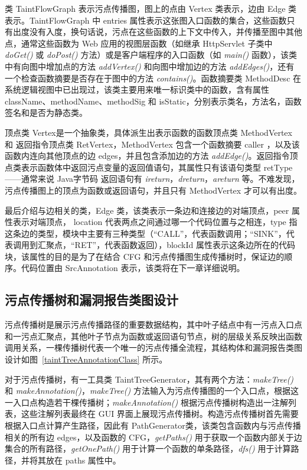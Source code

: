 类 TaintFlowGraph 表示污点传播图，图上的点由 Vertex 类表示，边由 Edge 类表示。TaintFlowGraph 中 entries 属性表示这张图入口函数的集合，这些函数只有出度没有入度，换句话说，污点在这些函数的上下文中传入，并传播至图中其他点，通常这些函数为 Web 应用的视图层函数（如继承 HttpServlet 子类中 \textit{doGet()} 或 \textit{doPost()} 方法）或是客户端程序的入口函数（如 \textit{main()} 函数），该类中有向图中增加点的方法 \textit{addVertex()} 和向图中增加边的方法 \textit{addEdges()}，还有一个检查函数摘要是否存在于图中的方法 \textit{contains()}。函数摘要类 MethodDesc 在系统逻辑视图中已出现过，该类主要用来唯一标识类中的函数，含有属性 className、methodName、methodSig 和 isStatic，分别表示类名，方法名，函数签名和是否为静态类。

顶点类 Vertex是一个抽象类，具体派生出表示函数的函数顶点类 MethodVertex 和 返回指令顶点类 RetVertex，MethodVertex 包含一个函数摘要 caller ，以及该函数内连向其他顶点的边 edges，并且包含添加边的方法 \textit{addEdge()}。返回指令顶点类表示函数体中返回污点变量的返回值语句，其属性只有该语句类型 retType——通常来说 Java字节码 返回语句有 \textit{ireturn}，\textit{dreturn}，\textit{areturn} 等。不难发现，污点传播图上的顶点为函数或返回语句，并且只有 MethodVertex 才可以有出度。

最后介绍与边相关的类，Edge 类，该类表示一条边和连接边的对端顶点，peer 属性表示对端顶点， location 代表两点之间通过哪一个代码位置与之相连，type 指这条边的类型，模块中主要有三种类型（“CALL”，代表函数调用；“SINK”，代表调用到汇聚点，“RET”，代表函数返回），blockId 属性表示这条边所在的代码块，该属性的目的是为了在结合 CFG 和污点传播图生成传播树时，保证边的顺序。代码位置由 SrcAnnotation  表示，该类将在下一章详细说明。

\subsection{污点传播树和漏洞报告类图设计}

污点传播树是展示污点传播路径的重要数据结构，其中叶子结点中有一污点入口点和一污点汇聚点，其他叶子节点为函数或返回语句节点，树的层级关系反映出函数调用关系，一棵传播树代表一个唯一的污点传播全流程，其结构体和漏洞报告类图设计如图~\ref{taintTreeAnnotationClass} 所示。

对于污点传播树，有一工具类 TaintTreeGenerator，其有两个方法：\textit{makeTree()} 和 \textit{makeAnnotation()}，\textit{makeTree()} 方法输入为污点传播图的一个入口点，根据这一入口点构造若干棵传播树；\textit{makeAnnotation()} 根据污点传播树构造出一注解列表，这些注解列表最终在 GUI 界面上展现污点传播树。构造污点传播树首先需要根据入口点计算产生路径，因此有 PathGenerator类，该类包含函数内与污点传播相关的所有边 edges，以及函数的 CFG，\textit{getPaths()} 用于获取一个函数内部关于边集合的所有路径，\textit{getOnePath()} 用于计算一个函数的单条路径，\textit{dfs()} 用于计算路径，并将其放在 paths 属性中。

